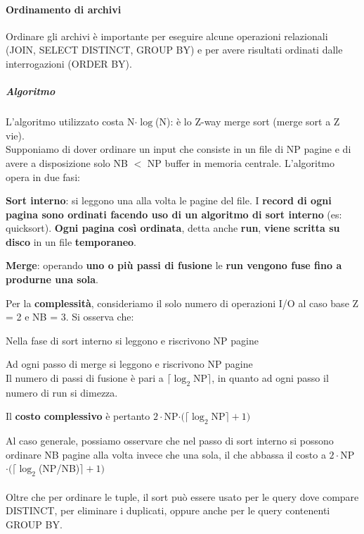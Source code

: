 \documentclass[10pt]{book}
\begin{document}
\paragraph{Ordinamento di archivi} Ordinare gli archivi è importante per eseguire alcune operazioni relazionali (JOIN, SELECT DISTINCT, GROUP BY) e per avere risultati ordinati dalle interrogazioni (ORDER BY).
\subparagraph{Algoritmo} L'algoritmo utilizzato costa N$\cdot\log$(N): è lo Z-way merge sort (merge sort a Z vie).\\
Supponiamo di dover ordinare un input che consiste in un file di NP pagine e di avere a disposizione solo NB $<$ NP buffer in memoria centrale. L'algoritmo opera in due fasi:
\begin{list}{}{}
	\item \textbf{Sort interno}: si leggono una alla volta le pagine del file. I \textbf{record di ogni pagina sono ordinati facendo uso di un algoritmo di sort interno} (es: quicksort). \textbf{Ogni pagina così ordinata}, detta anche \textbf{run}, \textbf{viene scritta su disco} in un file \textbf{temporaneo}.
	\item \textbf{Merge}: operando \textbf{uno o più passi di fusione} le \textbf{run vengono fuse fino a produrne una sola}.
\end{list}
Per la \textbf{complessità}, consideriamo il solo numero di operazioni I/O al caso base Z = 2 e NB = 3. Si osserva che:
\begin{list}{}{}
	\item Nella fase di sort interno si leggono e riscrivono NP pagine
	\item Ad ogni passo di merge si leggono e riscrivono NP pagine\\
	Il numero di passi di fusione è pari a $\lceil\log_2$NP$\rceil$, in quanto ad ogni passo il numero di run si dimezza.
	\item Il \textbf{costo complessivo} è pertanto $2\cdot$NP$\cdot(\lceil\log_2$NP$\rceil+1)$
\end{list}
Al caso generale, possiamo osservare che nel passo di sort interno si possono ordinare NB pagine alla volta invece che una sola, il che abbassa il costo a $2\cdot$NP$\cdot(\lceil\log_2$(NP/NB)$\rceil+1)$\\\\
Oltre che per ordinare le tuple, il sort può essere usato per le query dove compare DISTINCT, per eliminare i duplicati, oppure anche per le query contenenti GROUP BY.
\end{document}
